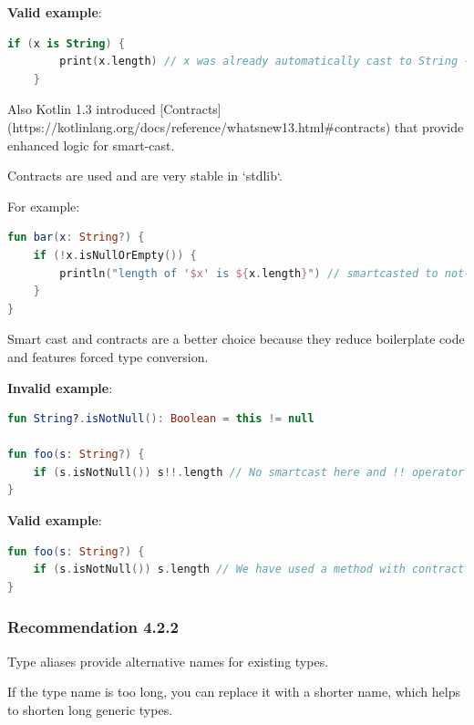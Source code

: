 {{{{\textbf{Valid example}:

\begin{lstlisting}[language=Kotlin]
    if (x is String) {
        print(x.length) // x was already automatically cast to String - no need to use 'as' keyword here
    }
\end{lstlisting}


Also Kotlin 1.3 introduced [Contracts](https://kotlinlang.org/docs/reference/whatsnew13.html\#contracts) that provide enhanced logic for smart-cast.

Contracts are used and are very stable in `stdlib`.



For example:



\begin{lstlisting}[language=Kotlin]
fun bar(x: String?) {
    if (!x.isNullOrEmpty()) {
        println("length of '$x' is ${x.length}") // smartcasted to not-null
    }
}
\end{lstlisting}


Smart cast and contracts are a better choice because they reduce boilerplate code and features forced type conversion.



\textbf{Invalid example}:

\begin{lstlisting}[language=Kotlin]
fun String?.isNotNull(): Boolean = this != null

fun foo(s: String?) {
    if (s.isNotNull()) s!!.length // No smartcast here and !! operator is used
}
\end{lstlisting}


\textbf{Valid example}:

\begin{lstlisting}[language=Kotlin]
fun foo(s: String?) {
    if (s.isNotNull()) s.length // We have used a method with contract from stdlib that helped compiler to execute smart cast
}
\end{lstlisting}


\subsubsection*{\textbf{Recommendation 4.2.2}}
\leavevmode\newline



Type aliases provide alternative names for existing types.

If the type name is too long, you can replace it with a shorter name, which helps to shorten long generic types.

}}}}
